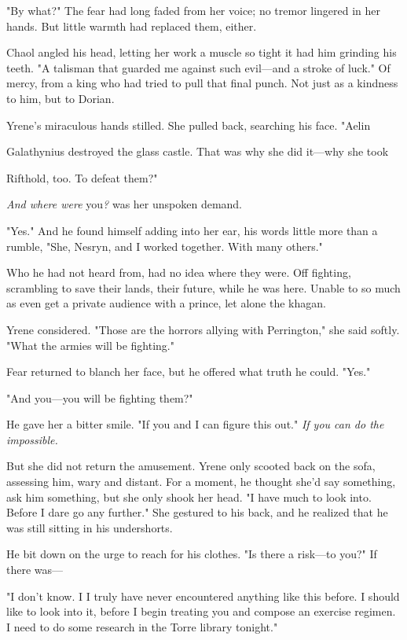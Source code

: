 "By what?" The fear had long faded from her voice; no tremor lingered in her hands. But little warmth had replaced them, either.

Chaol angled his head, letting her work a muscle so tight it had him grinding his teeth. "A talisman that guarded me against such evil---and a stroke of luck." Of mercy, from a king who had tried to pull that final punch. Not just as a kindness to him, but to Dorian.

Yrene's miraculous hands stilled. She pulled back, searching his face. "Aelin

Galathynius destroyed the glass castle. That was why she did it---why she took

Rifthold, too. To defeat them?"

\emph{And where were} you\emph{?} was her unspoken demand.

"Yes." And he found himself adding into her ear, his words little more than a rumble, "She, Nesryn, and I worked together. With many others."

Who he had not heard from, had no idea where they were. Off fighting, scrambling to save their lands, their future, while he was here. Unable to so much as even get a private audience with a prince, let alone the khagan.

Yrene considered. "Those are the horrors allying with Perrington," she said softly. "What the armies will be fighting."

Fear returned to blanch her face, but he offered what truth he could. "Yes."

"And you---you will be fighting them?"

He gave her a bitter smile. "If you and I can figure this out."
\emph{If you can do the impossible.}

But she did not return the amusement. Yrene only scooted back on the sofa, assessing him, wary and distant. For a moment, he thought she'd say something, ask him something, but she only shook her head. "I have much to look into. Before I dare go any further." She gestured to his back, and he realized that he was still sitting in his undershorts.

He bit down on the urge to reach for his clothes. "Is there a risk---to you?" If there was---

"I don't know. I  I truly have never encountered anything like this before. I should like to look into it, before I begin treating you and compose an exercise regimen. I need to do some research in the Torre library tonight."

